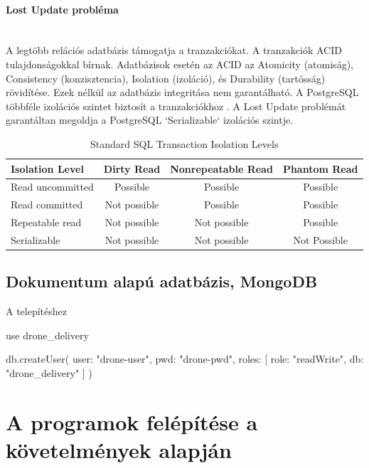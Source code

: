 \paragraph{Lost Update probléma} \mbox{} \\
A legtöbb relációs adatbázis támogatja a tranzakciókat. A tranzakciók ACID tulajdonságokkal bírnak.
Adatbázisok esetén az ACID az Atomicity (atomiság), Consistency (konzisztencia), Isolation (izoláció), és Durability (tartósság) rövidítése. Ezek nélkül az adatbázis integritása nem garantálható.
A PostgreSQL többféle izolációs szintet biztosít a tranzakciókhoz \cite{postgres-transaction}. A Lost Update problémát garantáltan megoldja a PostgreSQL `Serializable` izolációs szintje.
\begin{table}[h]
    \centering
    \caption{ Standard SQL Transaction Isolation Levels}
    \begin{tabular}{l|c|c|c|}
Isolation Level & Dirty Read  & Nonrepeatable Read & Phantom Read\\
        \hline
Read uncommitted  & Possible & Possible & Possible \\
\hline
Read committed & Not possible & Possible & Possible \\
\hline
Repeatable read & Not possible & Not possible & Possible \\
\hline
Serializable & Not possible & Not possible & Not Possible \\
        \hline
    \end{tabular}
\end{table}

\subsection{Dokumentum alapú adatbázis, MongoDB}

A telepítéshez
\begin{python}
    use drone_delivery
\end{python}

\begin{python}

    db.createUser(
        {
        user: "drone-user",
        pwd: "drone-pwd",
        roles: [
            {
            role: "readWrite",
            db: "drone_delivery"
        }
        ]
    }
    )
\end{python}



\section{A programok felépítése a követelmények alapján}


